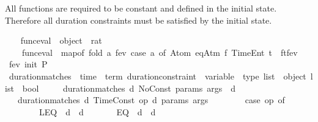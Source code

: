 \begin{isabellebody}
\begin{isamarkuptext}
All functions are required to be constant and defined in the initial state. 
  Therefore all duration constraints must be satisfied by the initial state.%
\end{isamarkuptext}\isamarkuptrue%
\ \ \isamarkupfalse%
\ func{\isacharunderscore}{\kern0pt}eval\ {\isacharcolon}{\kern0pt}{\isacharcolon}{\kern0pt}\ {\isachardoublequoteopen}object\ {\isasymrightharpoonup}\ rat{\isachardoublequoteclose}\ \isanewline
\ \ \ \ {\isachardoublequoteopen}func{\isacharunderscore}{\kern0pt}eval\ {\isasymequiv}\ map{\isacharunderscore}{\kern0pt}of\ {\isacharparenleft}{\kern0pt}fold\ {\isacharparenleft}{\kern0pt}{\isasymlambda}a\ fev{\isachardot}{\kern0pt}\ case\ a\ of\ Atom\ {\isacharparenleft}{\kern0pt}eqAtm\ f\ {\isacharparenleft}{\kern0pt}TimeEnt\ t{\isacharparenright}{\kern0pt}{\isacharparenright}{\kern0pt}\ {\isasymRightarrow}\ {\isacharparenleft}{\kern0pt}f{\isacharcomma}{\kern0pt}t{\isacharparenright}{\kern0pt}{\isacharhash}{\kern0pt}fev\ {\isacharbar}{\kern0pt}\ {\isacharunderscore}{\kern0pt}\ {\isasymRightarrow}\ fev{\isacharparenright}{\kern0pt}\ {\isacharparenleft}{\kern0pt}init\ P{\isacharparenright}{\kern0pt}\ {\isacharbrackleft}{\kern0pt}{\isacharbrackright}{\kern0pt}{\isacharparenright}{\kern0pt}{\isachardoublequoteclose}\isanewline
\isanewline
\ \ \isamarkupfalse%
\ duration{\isacharunderscore}{\kern0pt}matches\ {\isacharcolon}{\kern0pt}{\isacharcolon}{\kern0pt}\ {\isachardoublequoteopen}time\ {\isasymRightarrow}\ term\ duration{\isacharunderscore}{\kern0pt}constraint\ {\isasymRightarrow}\ {\isacharparenleft}{\kern0pt}variable\ {\isasymtimes}\ type{\isacharparenright}{\kern0pt}\ list\ {\isasymRightarrow}\ object\ list\ {\isasymRightarrow}\ bool{\isachardoublequoteclose}\ \isanewline
\ \ \ \ {\isachardoublequoteopen}duration{\isacharunderscore}{\kern0pt}matches\ d\ No{\isacharunderscore}{\kern0pt}Const\ params\ args\ {\isasymlongleftrightarrow}\ d\ {\isasymge}\ {}{\isachardoublequoteclose}\isanewline
\ \ {\isacharbar}{\kern0pt}\ {\isachardoublequoteopen}duration{\isacharunderscore}{\kern0pt}matches\ d\ {\isacharparenleft}{\kern0pt}Time{\isacharunderscore}{\kern0pt}Const\ op\ d{\isacharprime}{\kern0pt}{\isacharparenright}{\kern0pt}\ params\ args\ {\isasymlongleftrightarrow}\ \isanewline
\ \ \ \ \ \ {\isacharparenleft}{\kern0pt}case\ op\ of\isanewline
\ \ \ \ \ \ \ \ LEQ\ {\isasymRightarrow}\ d\ {\isasymle}\ d{\isacharprime}{\kern0pt}\isanewline
\ \ \ \ \ \ {\isacharbar}{\kern0pt}\ EQ\ {\isasymRightarrow}\ d\ {\isacharequal}{\kern0pt}\ d{\isacharprime}{\kern0pt}\isanewline

\end{isabellebody}
